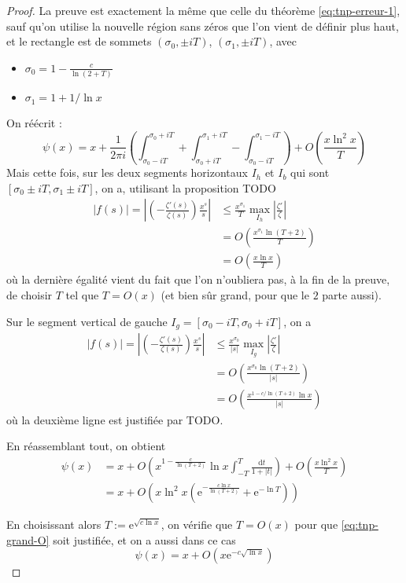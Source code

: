 \documentclass[french]{report}
\begin{document}
\begin{proof}
  La preuve est exactement la même que celle du théorème \ref{eq:tnp-erreur-1}, sauf qu'on utilise la nouvelle région sans zéros que l'on vient de définir plus haut, et le rectangle est de sommets $(\sigma_0,\pm iT)$, $(\sigma_1,\pm iT)$, avec 
  \begin{itemize}
    \item $\sigma_0=1-\frac{c}{\ln(2+T)}$
    \item $\sigma_1=1+1/\ln x$
  \end{itemize}
  On réécrit :
  \begin{equation}\label{eq:tnp-3-integrales}
    \psi(x) = x +\frac{1}{2\pi i}\left(
      \int_{\sigma_0-iT}^{\sigma_0+iT}
      +\int_{\sigma_0+iT}^{\sigma_1+iT}
      -\int_{\sigma_0-iT}^{\sigma_1-iT}
    \right)
    +O\left(\frac{x\ln^2x}{T}\right)
  \end{equation}
  Mais cette fois, sur les deux segments horizontaux $I_h$ et $I_b$ qui sont $[\sigma_0\pm iT,\sigma_1\pm iT]$, on a, utilisant la proposition TODO
  \begin{align}
    |f(s)| = \left|\left(-\frac{\zeta'(s)}{\zeta(s)}\right)\frac{x^s}{s}\right| & \leq\frac{x^{\sigma_1}}{T}\max_{I_h}\left|\frac{\zeta'}{\zeta}\right| \\
    & = O\left(\frac{x^{\sigma_1}\ln(T+2)}{T}\right) \\
    & = O\left(\frac{x\ln x}{T}\right) \label{eq:tnp-grand-O}
  \end{align}
  où la dernière égalité vient du fait que l'on n'oubliera pas, à la fin de la preuve, de choisir $T$ tel que $T=O(x)$ (et bien sûr grand, pour que le $2$ parte aussi).

  Sur le segment vertical de gauche $I_g=[\sigma_0-iT, \sigma_0+iT]$, on a
  \begin{align*}
    |f(s)| = \left|\left(-\frac{\zeta'(s)}{\zeta(s)}\right)\frac{x^s}{s}\right| & \leq\frac{x^{\sigma_0}}{|s|}\max_{I_g}\left|\frac{\zeta'}{\zeta}\right| \\
    & = O\left(\frac{x^{\sigma_0}\ln(T+2)}{|s|}\right) \\
    & = O\left(\frac{x^{1-c/\ln(T+2)}\ln x}{|s|}\right)
  \end{align*}
  où la deuxième ligne est justifiée par TODO.

  En réassemblant tout, on obtient
  \begin{align*}
    \psi(x) &= x + O\left(x^{1-\frac{c}{\ln(T+2)}}\ln x\int_{-T}^T\frac{\mathrm{d}t}{1+|t|}\right) + O\left(\frac{x\ln^2x}{T}\right) \\
    &= x + O\left(x\ln^2 x\left(\mathrm{e}^{-\frac{c\ln x}{\ln(T+2)}}+\mathrm{e}^{-\ln T}\right)\right)
  \end{align*}

  En choisissant alors $T:=\mathrm{e}^{\sqrt{c\ln x}}$, on vérifie que $T=O(x)$ pour que \ref{eq:tnp-grand-O} soit justifiée, et on a aussi dans ce cas
  \[ \psi(x)=x+O(x\mathrm{e}^{-c\sqrt{\ln x}}) \]
\end{proof}
\end{document}

